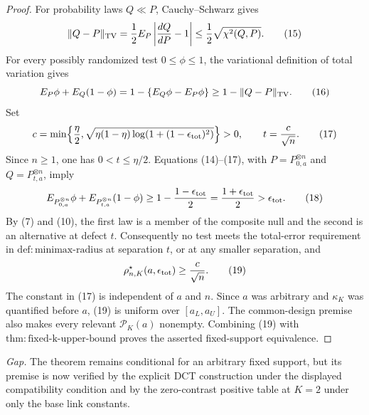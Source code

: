 \documentclass{article}
\begin{document}
\begin{proof}
For probability laws \(Q\ll P\), Cauchy--Schwarz gives
\[
\|Q-P\|_{\rm TV}
=\frac12E_P\left|\frac{dQ}{dP}-1\right|
\le\frac12\sqrt{\chi^2(Q,P)}.
\tag{15}
\]
For every possibly randomized test \(0\le\phi\le1\), the variational definition of total variation gives
\[
E_P\phi+E_Q(1-\phi)
=1-\{E_Q\phi-E_P\phi\}
\ge1-\|Q-P\|_{\rm TV}.
\tag{16}
\]
Set
\[
c=\min\!\left\{\frac\eta2,
\sqrt{\eta(1-\eta)\log\!\left(1+(1-\epsilon_{\rm tot})^2\right)}\right\}>0,
\qquad
t=\frac{c}{\sqrt n}.
\tag{17}
\]
Since \(n\ge1\), one has \(0<t\le\eta/2\). Equations (14)--(17), with \(P=P_{0,a}^{\otimes n}\) and \(Q=P_{t,a}^{\otimes n}\), imply
\[
E_{P_{0,a}^{\otimes n}}\phi+E_{P_{t,a}^{\otimes n}}(1-\phi)
\ge1-\frac{1-\epsilon_{\rm tot}}2
=\frac{1+\epsilon_{\rm tot}}2
>\epsilon_{\rm tot}.
\tag{18}
\]
By (7) and (10), the first law is a member of the composite null and the second is an alternative at defect \(t\). Consequently no test meets the total-error requirement in \(\mathrm{def:minimax\mbox{-}radius}\) at separation \(t\), or at any smaller separation, and
\[
\rho^\star_{n,K}(a,\epsilon_{\rm tot})\ge\frac{c}{\sqrt n}.
\tag{19}
\]
The constant in (17) is independent of \(a\) and \(n\). Since \(a\) was arbitrary and \(\kappa_K\) was quantified before \(a\), (19) is uniform over \([a_L,a_U]\). The common-design premise also makes every relevant \(\mathcal P_K(a)\) nonempty. Combining (19) with \(\mathrm{thm:fixed\mbox{-}k\mbox{-}upper\mbox{-}bound}\) proves the asserted fixed-support equivalence.
\end{proof}
\par\smallskip\noindent \textit{Gap.} The theorem remains conditional for an arbitrary fixed support, but its premise is now verified by the explicit DCT construction under the displayed compatibility condition and by the zero-contrast positive table at \(K=2\) under only the base link constants.
\end{document}
